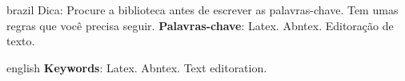 \setlength{\absparsep}{18pt} %

	\begin{resumo}[Resumo]
		\begin{otherlanguage*}{brazil}
			Dica: Procure a biblioteca antes de escrever as palavras-chave. Tem umas regras que você precisa seguir.
			\lipsum[1]
			\textbf{Palavras-chave}: Latex. Abntex. Editoração de texto.
		\end{otherlanguage*}
	\end{resumo}
	
\begin{resumo}[Abstract]
	\begin{otherlanguage*}{english}
		\lipsum[2]
		\textbf{Keywords}: Latex. Abntex. Text editoration.
	\end{otherlanguage*}
\end{resumo}

